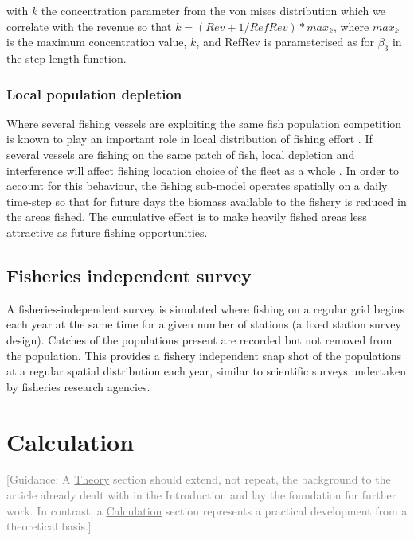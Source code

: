 \documentclass[review]{elsarticle}
\begin{document}
with $k$ the concentration parameter from the von mises distribution which we
correlate with the revenue so that $k = (Rev + 1 / RefRev) * max_{k}$,
where $max_{k}$ is the maximum concentration value, $k$, and RefRev is
parameterised as for $\beta_{3}$ in the step length function. 

\subsubsection{Local population depletion}

Where several fishing vessels are exploiting the same fish population
competition is known to play an important role in local distribution of fishing
effort \cite{Gillis1998}. If several vessels are fishing on the same patch of
fish, local depletion and interference will affect fishing location choice of
the fleet as a whole \cite{Rijnsdorp2000, Poos2007a}. In order to account for
this behaviour, the fishing sub-model operates spatially on a daily time-step
so that for future days the biomass available to the fishery is reduced in the
areas fished. The cumulative effect is to make heavily fished areas less
attractive as future fishing opportunities. 

\subsection{Fisheries independent survey}

A fisheries-independent survey is simulated where fishing on a regular grid
begins each year at the same time for a given number of stations (a fixed
station survey design). Catches of the populations present are recorded but not
removed from the population. This provides a fishery independent snap shot of
the populations at a regular spatial distribution each year, similar to
scientific surveys undertaken by fisheries research agencies. 

\section{Calculation}

\textcolor{gray}{[Guidance: A \underline{Theory} section should extend, not
repeat, the background to the article already dealt with in the	Introduction
and lay the foundation for further work.  In contrast, a
\underline{Calculation} section represents a practical development from a
theoretical basis.] \\}
\end{document}

